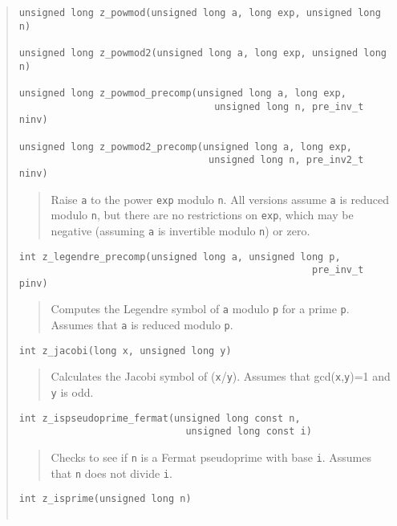 \documentclass[a4paper,10pt]{article}
\newcommand{\code}{\lstinline}
\begin{document}
\begin{quote}
\begin{lstlisting}
unsigned long z_powmod(unsigned long a, long exp, unsigned long n)

unsigned long z_powmod2(unsigned long a, long exp, unsigned long n)

unsigned long z_powmod_precomp(unsigned long a, long exp, 
                                  unsigned long n, pre_inv_t ninv)
                                     
unsigned long z_powmod2_precomp(unsigned long a, long exp, 
                                 unsigned long n, pre_inv2_t ninv)
\end{lstlisting}
\begin{quote}
Raise \code{a} to the power \code{exp} modulo \code{n}. All versions assume \code{a} is reduced modulo \code{n}, but there are no restrictions on \code{exp}, which may be negative (assuming \code{a} is invertible modulo \code{n}) or zero. 
\end{quote}                              

\begin{lstlisting}
int z_legendre_precomp(unsigned long a, unsigned long p, 
                                                   pre_inv_t pinv)
\end{lstlisting}
\begin{quote}
Computes the Legendre symbol of \code{a} modulo \code{p} for a prime \code{p}. Assumes that \code{a} is reduced modulo \code{p}.
\end{quote}

\begin{lstlisting}
int z_jacobi(long x, unsigned long y)
\end{lstlisting}
\begin{quote}
Calculates the Jacobi symbol of (\code{x}/\code{y}). Assumes that gcd(\code{x},\code{y})=1 and \code{y} is odd.  
\end{quote}

\begin{lstlisting}
int z_ispseudoprime_fermat(unsigned long const n,
                             unsigned long const i)
\end{lstlisting}
\begin{quote}
Checks to see if \code{n} is a Fermat pseudoprime with base \code{i}.  Assumes that \code{n} does not divide \code{i}. 
\end{quote}

\begin{lstlisting}
int z_isprime(unsigned long n)


\end{lstlisting}
\end{quote}
\end{document}
